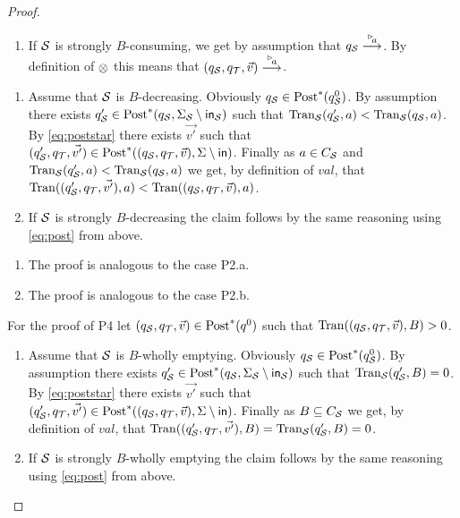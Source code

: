 \begin{proof}
\begin{enumerate} [label=P1.\alph*:,leftmargin=2.7em]
        \item If $\S$ is strongly $B$-consuming, we get by assumption that $q_\S \goes{\inact{a}}$. By definition of $\compos$ this means that $(q_\S,q_\T,\vec{v})\goes{\inact{a}}$.
    \end{enumerate}
    \begin{enumerate} [label=P2.\alph*:,leftmargin=2.7em]   
        \item Assume that $\S$ is $B$-decreasing. 
        Obviously $q_\S \in \post^*(q^0_\S)$. By assumption there exists $q'_\S \in \post^*(q_\S,\Sigma_\S \setminus \inset_{\S})$ such that $\val_\S(q'_\S,a) < \val_\S(q_\S,a)$. By \ref{eq:poststar} there exists $\vec{v'}$ such that $(q'_\S,q_\T,\vec{v'}) \in \post^*((q_\S,q_\T,\vec{v}),\Sigma \setminus \inset)$. Finally as $a \in\chan_\S$ and $\val_\S(q'_\S,a) < \val_\S(q_\S,a)$ we get, by definition of $val$, that $\val((q'_\S,q_\T,\vec{v'}),a) < \val((q_\S,q_\T,\vec{v}),a)$. 

        \item If $\S$ is strongly $B$-decreasing the claim follows by the same reasoning using \ref{eq:post} from above.
    \end{enumerate}
    \begin{enumerate} [label=P3.\alph*:,leftmargin=2.7em]  
        \item The proof is analogous to the case P2.a.
        \item The proof is analogous to the case P2.b.
    \end{enumerate}
For the proof of P4  let $(q_\S,q_\T,\vec{v}) \in \post^*(q^0)$ such that $\val((q_\S,q_\T,\vec{v}),B) > 0$. 
    \begin{enumerate} [label=P4.\alph*:,leftmargin=2.7em]  
        \item Assume that $\S$ is $B$-wholly emptying.
        Obviously $q_\S \in \post^*(q^0_\S)$. By assumption there exists $q'_\S \in \post^*(q_\S,\Sigma_\S \setminus \inset_{\S})$ such that $\val_\S(q'_\S,B) = 0$. By \ref{eq:poststar} there exists $\vec{v'}$ such that $(q'_\S,q_\T,\vec{v'}) \in \post^*((q_\S,q_\T,\vec{v}),\Sigma \setminus \inset)$. Finally as $B \subseteq \chan_\S$ we get, by definition of $val$, that $\val((q'_\S,q_\T,\vec{v'}),B) = \val_\S(q'_\S,B)=0$.

        \item If $\S$ is strongly $B$-wholly emptying the claim follows by the same reasoning using \ref{eq:post} from above.
    \end{enumerate}


\end{proof}
